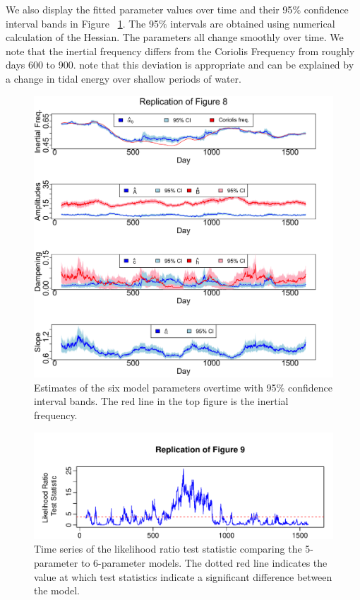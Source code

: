 \documentclass{stat572Style}
\begin{document}
   
 \par
 We also display the fitted parameter values over time and their 95$\%$ confidence interval bands in Figure ~\ref{fig: fig8}. 
The 95$\%$ intervals are obtained using numerical calculation of the Hessian.
The parameters all change smoothly over time. 
We note that the inertial frequency differs from the Coriolis Frequency from roughly days 600 to 900. 
\citet{Sykulski2016} note that this deviation is appropriate and can be explained by a change in tidal energy over shallow periods of water. 
 \begin{figure}[h!]
  \centering
    \includegraphics[width=\textwidth]{ReplicatedFigures/fig8.png}
        \caption{Estimates of the six model parameters overtime with 95$\%$ confidence interval bands. The red line in the top figure is the inertial frequency.}
        	\label{fig: fig8}
\end{figure}

 \begin{figure}[h!]
  \centering
    \includegraphics[width=.85\textwidth]{ReplicatedFigures/fig9.pdf}
        \caption{Time series of the likelihood ratio test statistic comparing the 5-parameter to 6-parameter models. The dotted red line indicates the value at which test statistics indicate a significant difference between the model. }
        	\label{fig: fig9}
\end{figure}
\end{document}
